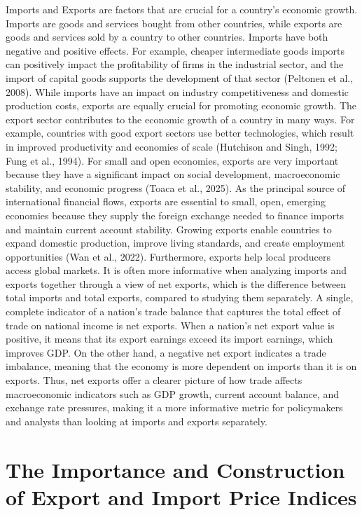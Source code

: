 \documentclass[12pt,a4paper]{report} %
\begin{document}
	Imports and Exports are factors that are crucial for a country's economic growth. Imports are goods and services bought from other countries, while exports are goods and services sold by a country to other countries. Imports have both negative and positive effects. For example, cheaper intermediate goods imports can positively impact the profitability of firms in the industrial sector, and the import of capital goods supports the development of that sector (Peltonen et al., 2008). While imports have an impact on industry competitiveness and domestic production costs, exports are equally crucial for promoting economic growth. The export sector contributes to the economic growth of a country in many ways. For example, countries with good export sectors use better technologies, which result in improved productivity and economies of scale (Hutchison and Singh, 1992; Fung et al., 1994). For small and open economies, exports are very important because they have a significant impact on social development, macroeconomic stability, and economic progress (Toaca et al., 2025). As the principal source of international financial flows, exports are essential to small, open, emerging economies because they supply the foreign exchange needed to finance imports and maintain current account stability. Growing exports enable countries to expand domestic production, improve living standards, and create employment opportunities (Wan et al., 2022). Furthermore, exports help local producers access global markets. It is often more informative when analyzing imports and exports together through a view of net exports, which is the difference between total imports and total exports, compared to studying them separately. A single, complete indicator of a nation's trade balance that captures the total effect of trade on national income is net exports. When a nation's net export value is positive, it means that its export earnings exceed its import earnings, which improves GDP. On the other hand, a negative net export indicates a trade imbalance, meaning that the economy is more dependent on imports than it is on exports. Thus, net exports offer a clearer picture of how trade affects macroeconomic indicators such as GDP growth, current account balance, and exchange rate pressures, making it a more informative metric for policymakers and analysts than looking at imports and exports separately. 
	
	\section{The Importance and Construction of Export and Import Price Indices}
	
\end{document}

